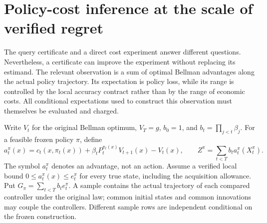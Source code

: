 \section{Policy-cost inference at the scale of verified regret}\label{sec:centered69}
The query certificate and a direct cost experiment answer different questions. Nevertheless, a certificate can improve the experiment without replacing its estimand. The relevant observation is a sum of optimal Bellman advantages along the actual policy trajectory. Its expectation is policy loss, while its range is controlled by the local accuracy contract rather than by the range of economic costs. All conditional expectations used to construct this observation must themselves be evaluated and charged.

Write $V_t$ for the original Bellman optimum, $V_T=g$, $b_0=1$, and $b_t=\prod_{j<t}\beta_j$. For a feasible frozen policy $\pi$, define
\[
 a_t^\pi(x)=c_t(x,\pi_t(x))+\beta_tP_t^{\pi_t(x)}V_{t+1}(x)-V_t(x),
 \qquad Z^\pi=\sum_{t<T}b_t a_t^\pi(X_t^\pi).
\]
The symbol $a_t^\pi$ denotes an advantage, not an action. Assume a verified local bound $0\le a_t^\pi(x)\le e_t^\pi$ for every true state, including the acquisition allowance. Put $G_\pi=\sum_{t<T}b_t e_t^\pi$. A sample contains the actual trajectory of each compared controller under the original law; common initial states and common innovations may couple the controllers. Different sample rows are independent conditional on the frozen construction.

